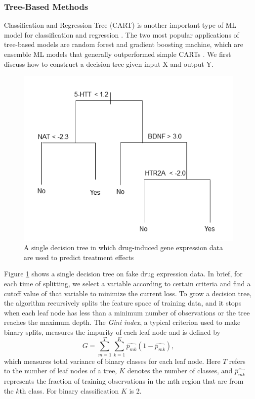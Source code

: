     \subsubsection{Tree-Based Methods}
      Classification and Regression Tree (CART) is another important type of ML model for classification and regression \cite{breiman1984classification,breiman2001random}. The two most popular applications of tree-based models are random forest and gradient boosting machine, which are ensemble ML models that generally outperformed simple CARTs \cite{breiman2001random,friedman2001greedy}. We first discuss how to construct a decision tree given input X and output Y.
      \begin{figure}[h]
        \centering
        \includegraphics[width=12cm]{figures/decision_tree.png}
        \caption{A single decision tree in which drug-induced gene expression data are used to predict treatment effects}
        \label{fig:intr_tree}
      \end{figure}
      
      Figure \ref{fig:intr_tree} shows a single decision tree on fake drug expression data. In brief, for each time of splitting, we select a variable according to certain criteria and find a cutoff value of that variable to minimize the current loss. To grow a decision tree, the algorithm recursively splits the feature space of training data, and it stops when each leaf node has less than a minimum number of observations or the tree reaches the maximum depth. The \textit{Gini index}, a typical criterion used to make binary splits, measures the impurity of each leaf node and is defined by \cite{james2013introduction}
      \begin{equation}
        G = \sum_{m=1}^T \sum_{k=1}^K  \hat{p_{mk}} (1 - \hat{p_{mk}}), 
      \end{equation}
      which measures total variance of binary classes for each leaf node. Here $T$ refers to the number of leaf nodes of a tree, $K$ denotes the number of classes, and $\hat{p_{mk}}$ represents the fraction of training observations in the mth region that are from the $k$th class. For binary classification $K$ is 2. 
      
